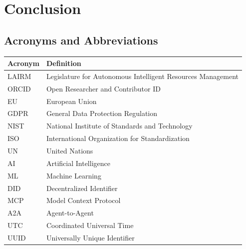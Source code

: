 \documentclass[12pt,a4paper,twoside,openright]{book}
\begin{document}
\part{Conclusion}












\backmatter




\chapter*{Acronyms and Abbreviations}

\begin{tabularx}{\textwidth}{@{}lX@{}}
\toprule
\textbf{Acronym} & \textbf{Definition} \\
\midrule
LAIRM & Legislature for Autonomous Intelligent Resources Management \\
ORCID & Open Researcher and Contributor ID \\
EU & European Union \\
GDPR & General Data Protection Regulation \\
NIST & National Institute of Standards and Technology \\
ISO & International Organization for Standardization \\
UN & United Nations \\
AI & Artificial Intelligence \\
ML & Machine Learning \\
DID & Decentralized Identifier \\
MCP & Model Context Protocol \\
A2A & Agent-to-Agent \\
UTC & Coordinated Universal Time \\
UUID & Universally Unique Identifier \\
\bottomrule
\end{tabularx}

\cleardoublepage

\printbibliography[heading=bibintoc,title={References and Bibliography}]
\end{document}

